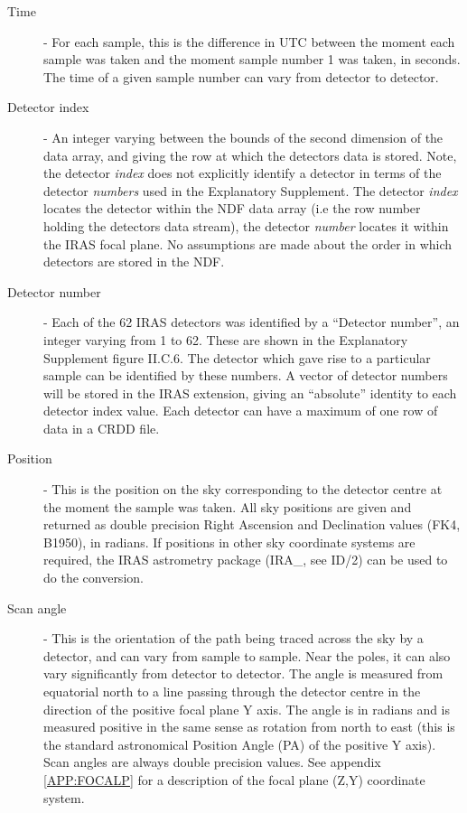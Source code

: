 \begin{description}
\item [Time] - For each sample, this is the difference in UTC between the moment
each sample was taken and the moment sample number 1 was taken, in seconds.
The time of a given sample number can vary from detector to detector.

\item [Detector index] - An integer varying between the bounds of the second
dimension of the data array, and giving the row at which the detectors data
is stored. Note, the detector {\em index } does not explicitly
identify a detector in terms of the detector {\em numbers } used in the
Explanatory Supplement. The detector {\em index } locates the detector
within the NDF data array (i.e the row number holding the detectors data
stream), the detector {\em number} locates it within the IRAS focal plane.
No assumptions are made about the order in which detectors are stored in the
NDF.

\item [Detector number] - Each of the 62 IRAS detectors was identified by a
``Detector number'', an integer varying from 1 to 62. These are shown in the
Explanatory Supplement figure II.C.6. The detector which gave rise to a
particular sample can be identified by these numbers. A vector of
detector numbers will be stored in the IRAS extension, giving an ``absolute''
identity to each detector index value. Each detector can have a maximum of
one row of data in a CRDD file.

\item [Position] - This is the position on the sky corresponding to the detector
centre at the moment the sample was taken. All sky positions are given and
returned as double precision Right Ascension and Declination values (FK4,
B1950), in radians. If positions in other sky coordinate systems are required,
the IRAS astrometry package (IRA\_, see ID/2) can be used to do the conversion.

\item [Scan angle] - This is the orientation of the path being traced across the
sky by a detector, and can vary from sample to sample. Near the poles, it can
also vary significantly from detector to detector. The angle is measured from
equatorial north to a line passing through the detector centre in the direction
of the positive focal plane Y axis. The angle is in radians and is measured
positive in the same sense as rotation from north to east (this is the standard
astronomical Position Angle (PA) of the positive Y axis). Scan angles are always
double precision values. See appendix \ref {APP:FOCALP} for a description of the
focal plane (Z,Y) coordinate system.


\end{description}
